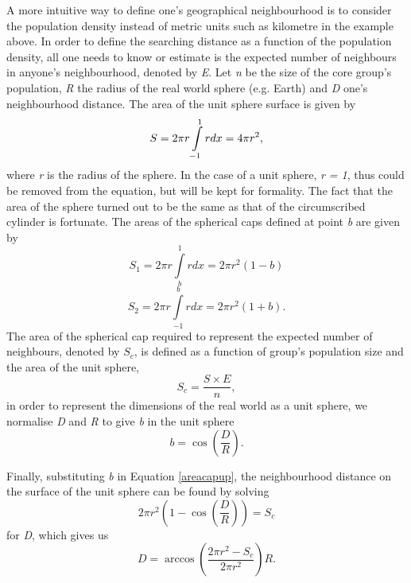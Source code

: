A more intuitive way to define one's geographical neighbourhood is to consider the
population density instead of metric units such as kilometre in the example above. In
order to define the searching distance as a function of the population density, all one
needs to know or estimate is the expected number of neighbours in anyone's neighbourhood,
denoted by \emph{E}. Let \emph{n} be the size of the core group's population, \emph{R}
the radius of the real world sphere (e.g. Earth) and \emph{D} one's neighbourhood
distance. The area of the unit sphere surface is given by
\begin{equation}\label{areasphere}
    S = 2\pi r \int\limits_{-1}^{1} rdx = 4\pi r^2\rm{,}
\end{equation}
where \emph{r} is the radius of the sphere. In the case of a unit sphere, \emph{r = 1},
thus could be removed from the equation, but will be kept for formality. The fact that
the area of the sphere turned out to be the same as that of the circumscribed cylinder is
fortunate. The areas of the spherical caps defined at point \emph{b} are given by
\begin{equation}\label{areacapup}
  S_1 = 2\pi r \int\limits_{b}^{1} rdx = 2\pi r^2(1 - b)
\end{equation}
\begin{equation}\label{areacaplow}
S_2 = 2\pi r \int\limits_{-1}^{b} rdx = 2\pi r^2(1 + b).
\end{equation}
The area of the spherical cap required to represent the expected number of neighbours,
denoted by $S_c$, is defined as a function of group's population size and the area of the
unit sphere,
\begin{equation}\label{worldcap}
    S_c = \frac{S \times E}{n},
\end{equation}
in order to represent the dimensions of the real world as a unit sphere, we normalise
\emph{D} and \emph{R} to give \emph{b} in the unit sphere
\begin{equation}\label{worldtounit}
    b = \cos (\frac{D}{R}).
\end{equation}

Finally, substituting \emph{b} in Equation \ref{areacapup}, the neighbourhood distance on
the surface of the unit sphere can be found by solving
\begin{equation}\label{newareacapup}
  2\pi r^2(1 - \cos (\frac{D}{R})) = S_c
\end{equation}
for \emph{D}, which gives us
\begin{equation}\label{solvedistance}
  D = \arccos\left(\frac{2\pi r^2 - S_c}{2\pi r^2}\right)R.
\end{equation}

